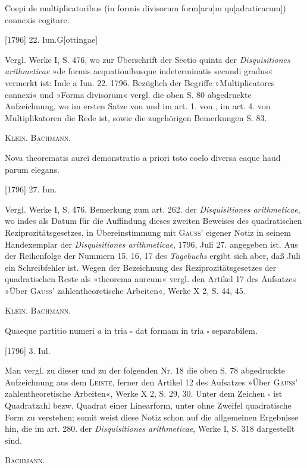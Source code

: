 \clearpage{}
\indent Coepi de multiplicatoribus (in formis divisorum form[aru]m qu[adraticarum]) connexis cogitare.
\par\noindent\hfill[1796] 22. Iun.\quad G[ottingae]

\medskip\begingroup\small
\indent Vergl. Werke I, S. 476, wo zur Überschrift der Sectio quinta der \textit{Disquisitiones arithmeticae} »de formis aequationibusque indeterminatis secundi gradus« vermerkt ist: Inde a Iun. 22. 1796. Bezüglich der Begriffe »Multiplicatores connexi« und »Forma divisorum« vergl. die oben S. 80 abgedruckte Aufzeichnung, wo im ersten Satze von  und im art. 1. von , im art. 4. von  Multiplikatoren die Rede ist, sowie die zugehörigen Bemerkungen S. 83.
\par\noindent\hfill\textsc{Klein. Bachmann.}
\par\endgroup

\indent Nova theorematis aurei demonstratio a priori toto coelo diversa eaque haud parum elegans.
\par\noindent\hfill[1796] 27. Iun.

\medskip\begingroup\small
\indent Vergl. Werke I, S. 476, Bemerkung zum art. 262. der \textit{Disquisitiones arithmeticae}, wo indes als Datum für die Auffindung dieses zweiten Beweises des quadratischen Reziprozitätsgesetzes, in Übereinstimmung mit \textsc{Gauss}' eigener Notiz in seinem Handexemplar der \textit{Disquisitiones arithmeticae}, 1796, Juli 27. angegeben ist. Aus der Reihenfolge der Nummern 15, 16, 17 des \textit{Tagebuchs} ergibt sich aber, daß Juli ein Schreibfehler ist. Wegen der Bezeichnung des Reziprozitätsgesetzes der quadratischen Reste als »theorema aureum« vergl. den Artikel 17 des Aufsatzes »Über \textsc{Gauss}' zahlentheoretische Arbeiten«, Werke X 2, S. 44, 45.
\par\noindent\hfill\textsc{Klein. Bachmann.}
\par\endgroup

\indent Quaeque partitio numeri \(a\) in tria \(\square\) dat formam in tria \(\square\) separabilem.
\par\noindent\hfill[1796] 3. Iul.

\medskip\begingroup\small
\indent Man vergl. zu dieser und zu der folgenden Nr. 18 die oben S. 78 abgedruckte Aufzeichnung aus dem \textsc{Leiste}, ferner den Artikel 12 des Aufsatzes »Über \textsc{Gauss}' zahlentheoretische Arbeiten«, Werke X 2, S. 29, 30. Unter dem Zeichen \(\square\) ist Quadratzahl bezw. Quadrat einer Linearform, unter  ohne Zweifel  quadratische Form zu verstehen; somit weist diese Notiz schon auf die allgemeinen Ergebnisse hin, die im art. 280. der \textit{Disquisitiones arithmeticae}, Werke I, S. 318 dargestellt sind.
\par\noindent\hfill\textsc{Bachmann}.
\par\endgroup

